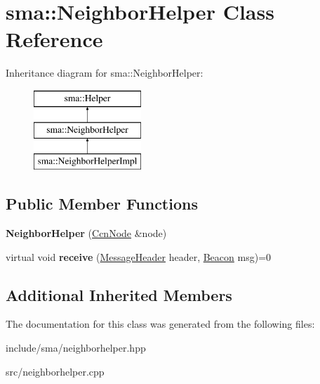 \hypertarget{classsma_1_1NeighborHelper}{\section{sma\-:\-:Neighbor\-Helper Class Reference}
\label{classsma_1_1NeighborHelper}
}
Inheritance diagram for sma\-:\-:Neighbor\-Helper\-:\begin{figure}[H]
\begin{center}
\leavevmode
\includegraphics[height=3.000000cm]{classsma_1_1NeighborHelper}
\end{center}
\end{figure}
\subsection*{Public Member Functions}
\begin{DoxyCompactItemize}
\item 
\hypertarget{classsma_1_1NeighborHelper_af7ff94940765d61ad2633e6dd67a2503}{{\bfseries Neighbor\-Helper} (\hyperlink{classsma_1_1CcnNode}{Ccn\-Node} \&node)}\label{classsma_1_1NeighborHelper_af7ff94940765d61ad2633e6dd67a2503}

\item 
\hypertarget{classsma_1_1NeighborHelper_a289846f1dc67c7e8c2a4147416e54749}{virtual void {\bfseries receive} (\hyperlink{structsma_1_1MessageHeader}{Message\-Header} header, \hyperlink{structsma_1_1Beacon}{Beacon} msg)=0}\label{classsma_1_1NeighborHelper_a289846f1dc67c7e8c2a4147416e54749}

\end{DoxyCompactItemize}
\subsection*{Additional Inherited Members}


The documentation for this class was generated from the following files\-:\begin{DoxyCompactItemize}
\item 
include/sma/neighborhelper.\-hpp\item 
src/neighborhelper.\-cpp\end{DoxyCompactItemize}
